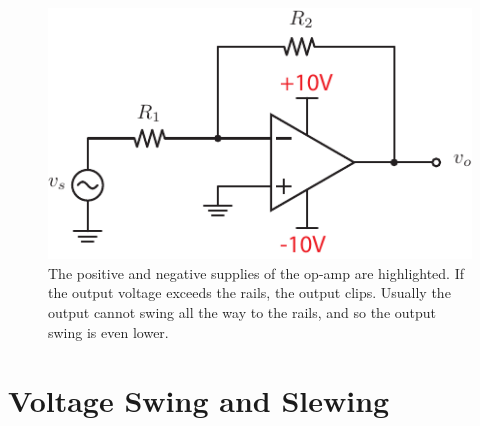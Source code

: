 \newpage
\begin{figure}[t]
\centering
\includegraphics[scale=1.25]{opamp_invert_gain_supplies}
\caption{The positive and negative supplies of the op-amp are highlighted.  If the output voltage exceeds the rails, the output clips.  Usually the output cannot swing all the way to the rails, and so the output swing is even lower.}
\label{fig:opamp_invert_gain_supplies}
\end{figure}
\section{Voltage Swing and Slewing }
